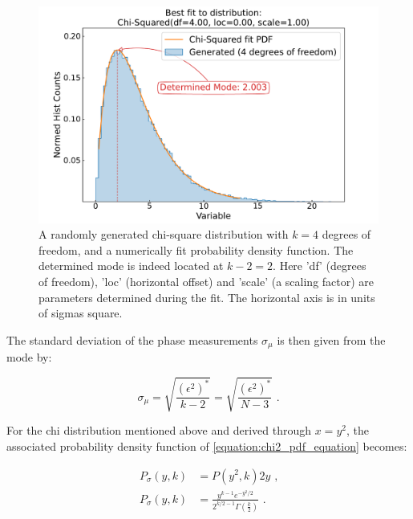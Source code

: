 \begin{figure}[!htb]
    \centering
    \includegraphics*[width=\textwidth]{Figures/Other_Studies/phase_chisquare_demo_fit.pdf}
    \caption{A randomly generated chi-square distribution with \(k = 4\) degrees of freedom, and a numerically fit probability density function. The determined mode is indeed located at \(k - 2 = 2\). Here 'df' (degrees of freedom), 'loc' (horizontal offset) and 'scale' (a scaling factor) are parameters determined during the fit. The horizontal axis is in units of sigmas square.}
    \label{figure:chisquare_demo_fit}
\end{figure}

The standard deviation of the phase measurements \(\sigma_{\mu}\) is then given from the mode by:

\begin{equation}
    \sigma_{\mu} = \sqrt{\frac{(\epsilon^2)^*}{k - 2}} = \sqrt{\frac{(\epsilon^2)^*}{N - 3}} \text{ .}
    \label{equation:stdev_from_chi2_mode}
\end{equation}

For the chi distribution mentioned above and derived through \(x = y^2\), the associated probability density function of \cref{equation:chi2_pdf_equation} becomes:

\begin{equation}
    \begin{aligned}
        P_{\sigma}(y , k) &= P (y^2 , k) 2y \text{ ,} \\
        P_{\sigma}(y , k) &= \frac{y^{k-1} e^{-y^2/2}} {2^{k/2-1} \Gamma(\frac{k}{2})} \text{ .}
    \end{aligned}
    \label{equation:chi_pdf}  
\end{equation}

